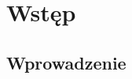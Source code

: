 \documentclass[oneside,a4paper]{book}
\begin{document}
\frontmatter
\tableofcontents

\null
\vfill

\mainmatter
\def\arraystretch{1.5}

\chapter{Wstęp}
\section{Wprowadzenie}
\end{document}
